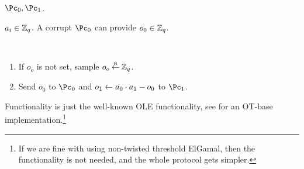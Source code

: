 \begin{functionality}\label{func:Mult}~
\item[Parties:] $\Pc_0,\Pc_1$.
\item[$\Pc_i$'s private input:] $a_i \in {\mathbb Z}_q$. A corrupt $\Pc_0$ can provide $o_0 \in {\mathbb Z}_q$.

\item[Operation:] ~
\begin{enumerate}
	\item If $o_o$ is not set, sample $o_o \mathbin{\stackrel{\mbox{\tiny R}}{\leftarrow}} {\mathbb Z}_q$.
	
	\item Send $o_0$ to $\Pc_0$ and $o_1 \leftarrow a_0 \cdot a_1 - o_0$ to $\Pc_1$.
\end{enumerate}
 
\end{functionality}
Functionality \Mult is just the well-known OLE functionality, see \cite{HaitnerMRT22} for an OT-base  implementation.\footnote{If we are fine with  using non-twisted threshold ElGamal, then the \Mult functionality is not needed, and the whole protocol gets simpler.}


